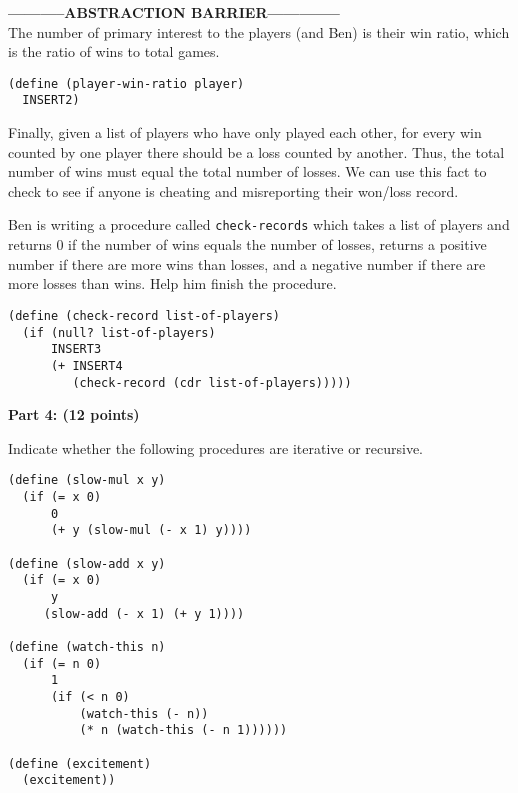 
{\bf -----------ABSTRACTION BARRIER--------------}\\

The number of primary interest to the players (and Ben) is their win
ratio, which is the ratio of wins to total games.

\begin{verbatim}
(define (player-win-ratio player)
  INSERT2)
\end{verbatim}


Finally, given a list of players who have only played each other, for
every win counted by one player there should be a loss counted by
another.  Thus, the total number of wins must equal the total number
of losses.  We can use this fact to check to see if anyone is cheating
and misreporting their won/loss record.

Ben is writing a procedure called {\tt check-records} which takes a
list of players and returns 0 if the number of wins equals the number
of losses, returns a positive number if there are more wins than
losses, and a negative number if there are more losses than wins.
Help him finish the procedure.

\begin{verbatim}
(define (check-record list-of-players)
  (if (null? list-of-players)
      INSERT3
      (+ INSERT4
         (check-record (cdr list-of-players)))))
\end{verbatim}



\newpage
{\bf Part 4:  (12 points)}

Indicate whether the following procedures are iterative or recursive.

\begin{verbatim}
(define (slow-mul x y)
  (if (= x 0)
      0
      (+ y (slow-mul (- x 1) y))))

(define (slow-add x y)
  (if (= x 0)
      y
     (slow-add (- x 1) (+ y 1))))

(define (watch-this n)
  (if (= n 0)
      1
      (if (< n 0)
          (watch-this (- n))
          (* n (watch-this (- n 1))))))

(define (excitement)
  (excitement))
\end{verbatim}


